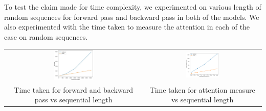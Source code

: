 \documentclass{article}
\begin{document}
To test the claim made for time complexity, we experimented on various length of random sequences for forward pass and backward pass in both of the models. We also experimented with the time taken to measure the attention in each of the case on random sequences.
\begin{center}
    \begin{tabular}{c c}
         \includegraphics[width=0.3\textwidth]{images/forwardpassandbackwardpass.jpg} &
         \includegraphics[width=0.3\textwidth]{images/attentiontimemeasure.png}\\
         Time taken for forward and backward pass vs sequential length & Time taken for attention measure vs sequential length
    \end{tabular}
\end{center}
\end{document}

